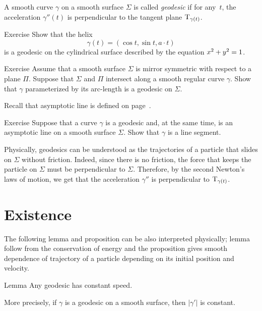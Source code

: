 A smooth curve $\gamma$ on a smooth surface $\Sigma$ is called \emph{geodesic} if for any~$t$, the acceleration $\gamma''(t)$ is perpendicular to the tangent plane $\mathrm{T}_{\gamma(t)}$.

\begin{thm}{Exercise}\label{ex:helix=geodesic}
Show that the helix 
\[\gamma(t)=(\cos t,\sin t, a\cdot t)\]
is a geodesic on the cylindrical surface described by the equation $x^2\z+y^2=1$.
\end{thm}

\begin{thm}{Exercise}\label{ex:reflection-geodesic}
Assume that a smooth surface $\Sigma$ is mirror symmetric with respect to  a plane $\Pi$.
Suppose that $\Sigma$ and $\Pi$ intersect along a smooth regular curve $\gamma$.
Show that $\gamma$ parameterized by its arc-length is a geodesic on $\Sigma$.
\end{thm}

Recall that asymptotic line is defined on page~\pageref{page:asymptotic line}.

\begin{thm}{Exercise}\label{ex:asymptotic-geodesic}
Suppose that a curve $\gamma$ is a geodesic and, at the same time, is an asymptotic line on a smooth surface $\Sigma$.
Show that $\gamma$ is a line segment.
\end{thm}

Physically, geodesics can be understood as the trajectories of a particle that slides on $\Sigma$ without friction.
Indeed, since there is no friction, the force that keeps the particle on $\Sigma$ must be perpendicular to $\Sigma$.
Therefore, by the second Newton's laws of motion,
we get that the acceleration $\gamma''$ is perpendicular to $\mathrm{T}_{\gamma(t)}$.

\section{Existence}

The following lemma and proposition can be also interpreted physically;
lemma follow from the conservation of energy and the proposition gives smooth dependence of trajectory of a particle depending on its initial position and velocity.

\begin{thm}{Lemma}\label{lem:constant-speed}
Any geodesic has constant speed.

More precisely, if $\gamma$ is a geodesic on a smooth surface, then $|\gamma'|$ is constant.
\end{thm}

